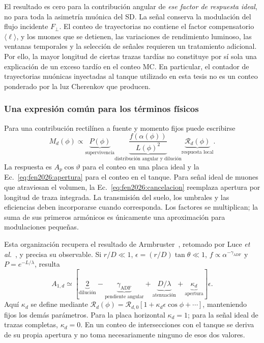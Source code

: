 El resultado es cero para la contribución angular de \emph{ese factor de respuesta ideal}, no para toda la asimetría muónica del SD. La señal conserva la modulación del flujo incidente $F_\perp$. El conteo de trayectorias no contiene el factor compensatorio $\langle\ell\rangle$, y los muones que se detienen, las variaciones de rendimiento luminoso, las ventanas temporales y la selección de señales requieren un tratamiento adicional. Por ello, la mayor longitud de ciertas trazas tardías no constituye por sí sola una explicación de un exceso tardío en el conteo MC. En particular, el contador de trayectorias muónicas inyectadas al tanque utilizado en esta tesis no es un conteo ponderado por la luz Cherenkov que producen.

\subsubsection{Una expresión común para los términos físicos}
\label{subsubsec:fen2026:marco}

Para una contribución rectilínea a fuente y momento fijos puede escribirse
\begin{equation}
M_d(\phi)\propto
\underbrace{P(\phi)}_{\text{supervivencia}}
\underbrace{\frac{f(\alpha(\phi))}{L(\phi)^2}}_{\text{distribución angular y dilución}}
\underbrace{\mathcal R_d(\phi)}_{\text{respuesta local}}.
\label{eq:fen2026:producto}
\end{equation}
La respuesta es $A_p\cos\vartheta$ para el conteo en una placa ideal y la Ec.~\ref{eq:fen2026:apertura} para el conteo en el tanque. Para señal ideal de muones que atraviesan el volumen, la Ec.~\ref{eq:fen2026:cancelacion} reemplaza apertura por longitud de traza integrada. La transmisión del suelo, los umbrales y las eficiencias deben incorporarse cuando corresponda. Los factores se multiplican; la suma de sus primeros armónicos es únicamente una aproximación para modulaciones pequeñas.

Esta organización recupera el resultado de Armbruster~\cite{Armbruster2018}, retomado por Luce \textit{et al.}~\cite{Luce_ICRC2021}, y precisa su observable. Si $r/D\ll1$, $\epsilon=(r/D)\tan\theta\ll1$, $f\propto\alpha^{-\gamma_{\mathrm{ADF}}}$ y $P=e^{-L/\lambda}$, resulta
\begin{equation}
A_{1,d}\simeq
\left[\underbrace{2}_{\text{dilución}}
-\underbrace{\gamma_{\mathrm{ADF}}}_{\text{pendiente angular}}
+\underbrace{D/\lambda}_{\text{atenuación}}
+\underbrace{\kappa_d}_{\text{apertura}}\right]\epsilon.
\label{eq:fen2026:bracket}
\end{equation}
Aquí $\kappa_d$ se define mediante $\mathcal R_d(\phi)=\mathcal R_{d,0}[1+\kappa_d\epsilon\cos\phi+\cdots]$, manteniendo fijos los demás parámetros. Para la placa horizontal $\kappa_d=1$; para la señal ideal de trazas completas, $\kappa_d=0$. En un conteo de intersecciones con el tanque se deriva de su propia apertura y no toma necesariamente ninguno de esos dos valores.

